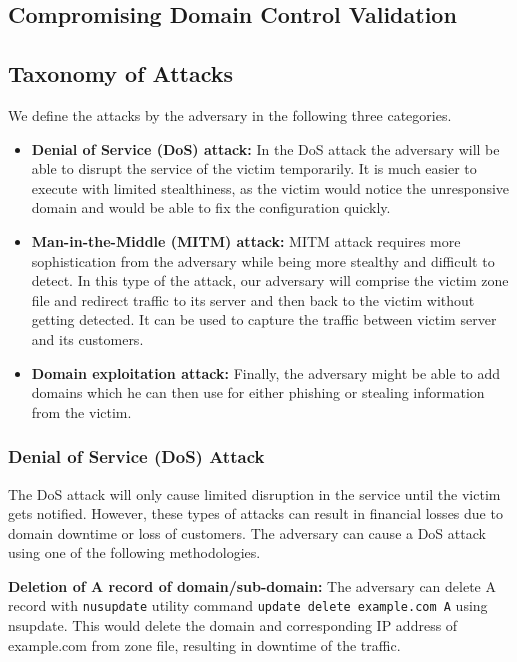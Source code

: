 \subsection{Compromising Domain Control Validation}

\subsection{Taxonomy of Attacks}
We define the attacks by the adversary in the following three categories. 

\begin{itemize}
\item \textbf{Denial of Service (DoS) attack:} In the DoS attack the adversary will be able to disrupt the service of the victim temporarily. It is much easier to execute with limited stealthiness, as the victim would notice the unresponsive domain and would be able to fix the configuration quickly. 


\item \textbf{Man-in-the-Middle (MITM) attack:} MITM attack requires more sophistication from the adversary while being more stealthy and difficult to detect. In this type of the attack, our adversary will comprise the victim zone file and redirect traffic to its server and then back to the victim without getting detected. It can be used to capture the traffic between victim server and its customers.  

\item \textbf{Domain exploitation attack:} Finally, the adversary might be able to add domains which he can then use for either phishing or stealing information from the victim.  
\end{itemize}


\subsubsection{Denial of Service (DoS) Attack} 
The DoS attack will only cause limited disruption in the service until the victim gets notified. However, these types of attacks can result in financial losses due to domain downtime or loss of customers. The adversary can cause a DoS attack using one of the following methodologies. 

\textbf{Deletion of A record of domain/sub-domain:} The adversary can delete A record with \texttt{nusupdate} utility command \texttt{update delete example.com A} using nsupdate. This would delete the domain and corresponding IP address of example.com from zone file, resulting in downtime of the traffic. 

